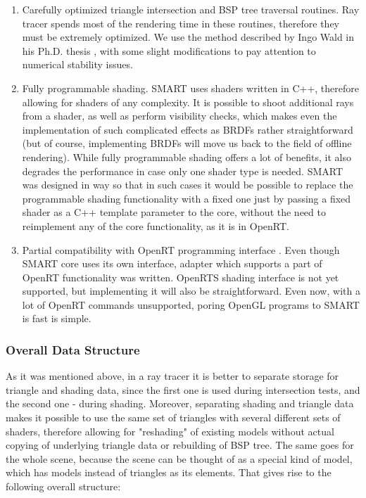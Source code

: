 \documentclass{article}
\begin{document}
\begin{enumerate}
\item Carefully optimized triangle intersection and BSP tree traversal routines. Ray tracer spends most of the rendering time in these routines, therefore they must be extremely optimized. We use the method described by Ingo Wald in his Ph.D. thesis \cite{wald04}, with some slight modifications to pay attention to numerical stability issues.
\item Fully programmable shading. SMART uses shaders written in C++, therefore allowing for shaders of any complexity. It is possible to shoot additional rays from a shader, as well as perform visibility checks, which makes even the implementation of such complicated effects as BRDFs rather straightforward (but of course, implementing BRDFs will move us back to the field of offline rendering). While fully programmable shading offers a lot of benefits, it also degrades the performance in case only one shader type is needed. SMART was designed in way so that in such cases it would be possible to replace the programmable shading functionality with a fixed one just by passing a fixed shader as a C++ template parameter to the core, without the need to reimplement any of the core functionality, as it is in OpenRT.
\item Partial compatibility with OpenRT programming interface \cite{dietrich03}. Even though SMART core uses its own interface, adapter which supports a part of OpenRT functionality was written. OpenRTS shading interface is not yet supported, but implementing it will also be straightforward. Even now, with a lot of OpenRT commands unsupported, poring OpenGL programs to SMART is fast is simple.
\end{enumerate}

\subsubsection{Overall Data Structure}
As it was mentioned above, in a ray tracer it is better to separate storage for triangle and shading data, since the first one is used during intersection tests, and the second one - during shading. Moreover, separating shading and triangle data makes it possible to use the same set of triangles with several different sets of shaders, therefore allowing for "reshading" of existing models without actual copying of underlying triangle data or rebuilding of BSP tree. The same goes for the whole scene, because the scene can be thought of as a special kind of model, which has models instead of triangles as its elements. That gives rise to the following overall structure:
\end{document}
